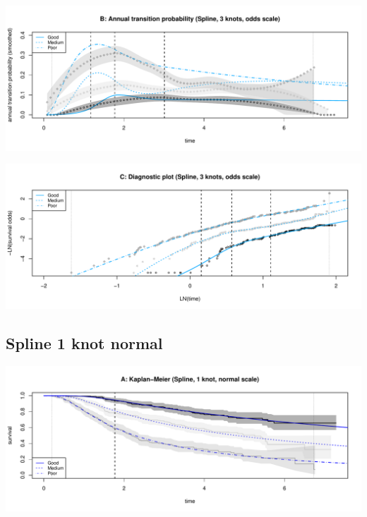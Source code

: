\documentclass[
]{article}
\begin{document}
\begin{flushleft}\includegraphics[height=0.25\textheight]{Images/spline_odds3-2} \end{flushleft}

\begin{flushleft}\includegraphics[height=0.25\textheight]{Images/spline_odds3-3} \end{flushleft}

\clearpage

\hypertarget{spline-1-knot-normal}{%
\subsection{Spline 1 knot normal}\label{spline-1-knot-normal}}

\begin{flushleft}\includegraphics[height=0.25\textheight]{Images/spline_norm1-1} \end{flushleft}
\end{document}
